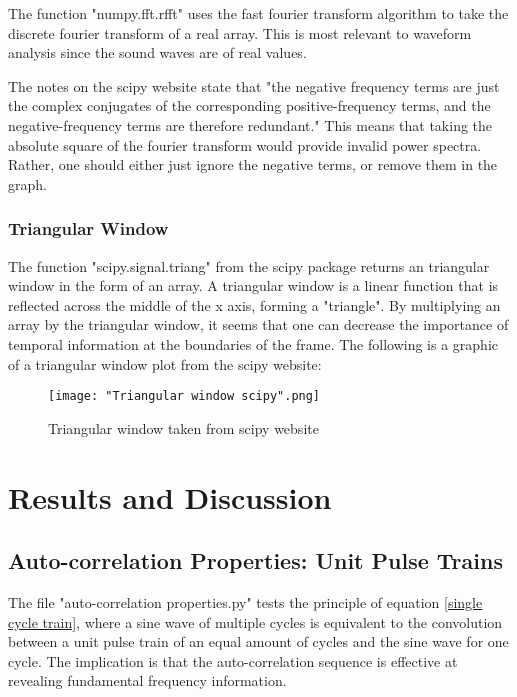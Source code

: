 \documentclass[12pt]{article}
\begin{document}
The function "numpy.fft.rfft" uses the fast fourier transform algorithm to take the discrete fourier transform of a real array.\cite{ab} This is most relevant to waveform analysis since the sound waves are of real values.\newline

The notes on the scipy website state that "the negative frequency terms are just the complex conjugates of the corresponding positive-frequency terms, and the negative-frequency terms are therefore redundant."\cite{ab} This means that taking the absolute square of the fourier transform would provide invalid power spectra. Rather, one should either just ignore the negative terms, or remove them in the graph.

\subsubsection{Triangular Window}

The function "scipy.signal.triang" from the scipy package returns an triangular window in the form of an array\cite{ab}. A triangular window is a linear function that is reflected across the middle of the x axis, forming a "triangle". By multiplying an array by the triangular window, it seems that one can decrease the importance of temporal information at the boundaries of the frame. The following is a graphic of a triangular window plot from the scipy website:

\begin{figure}[h]
	\texttt{[image: "Triangular window scipy".png]}
	\caption{Triangular window taken from scipy website\cite{ab}}
	\endminipage\hfill
\end{figure}

\section{Results and Discussion}

\subsection{Auto-correlation Properties: Unit Pulse Trains}

The file "auto-correlation properties.py" tests the principle of equation \ref{single cycle train}, where a sine wave of multiple cycles is equivalent to the convolution between a unit pulse train of an equal amount of cycles and the sine wave for one cycle. The implication is that the auto-correlation sequence is effective at revealing fundamental frequency information.
\end{document}
